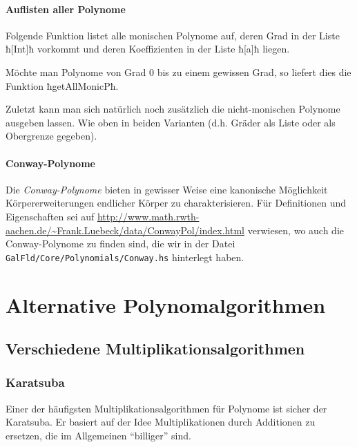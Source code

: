 
\paragraph{Auflisten aller Polynome} 
Folgende Funktion listet alle monischen Polynome auf, deren Grad in der Liste
ħ[Int]ħ vorkommt und deren Koeffizienten in der Liste ħ[a]ħ liegen.


Möchte man Polynome von Grad $0$ bis zu einem gewissen Grad, so liefert dies
die Funktion ħgetAllMonicPħ.


Zuletzt kann man sich natürlich noch zusätzlich die nicht-monischen Polynome
ausgeben lassen. Wie oben in beiden Varianten (d.h. Gräder als Liste oder als
Obergrenze gegeben).


\paragraph{Conway-Polynome}
Die \emph{Conway-Polynome} bieten in gewisser Weise eine kanonische Möglichkeit
Körpererweiterungen endlicher Körper zu charakterisieren. Für Definitionen
und Eigenschaften sei auf
\url{http://www.math.rwth-aachen.de/~Frank.Luebeck/data/ConwayPol/index.html}
verwiesen, wo auch die Conway-Polynome zu finden sind, die wir in der Datei
\texttt{GalFld/Core/Polynomials/Conway.hs} hinterlegt haben.




\section{Alternative Polynomalgorithmen}
\subsection{Verschiedene Multiplikationsalgorithmen}
\label{subsec:multAlgs}

\subsubsection{Karatsuba}
Einer der häufigsten Multiplikationsalgorithmen für Polynome ist sicher der
Karatsuba. Er basiert auf der Idee Multiplikationen durch Additionen zu
ersetzen, die im Allgemeinen "`billiger"' sind. 

